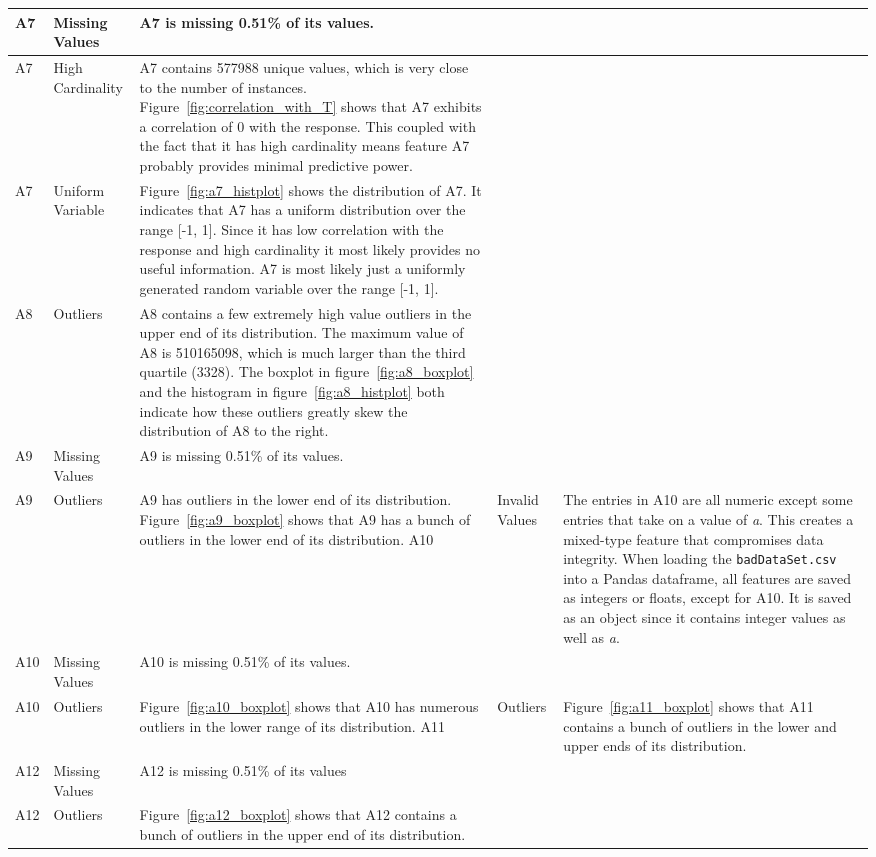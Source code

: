 \documentclass[11pt]{report}
\begin{document}
\begin{longtable}{lp{5cm}p{8cm}}
\midrule
A7 & Missing Values & A7 is missing 0.51\% of its values. \\
\midrule
A7 & High Cardinality & A7 contains 577988 unique values, which is very close to the number of instances. Figure~\ref{fig:correlation_with_T} shows that A7 exhibits a correlation of 0 with the response. This coupled with the fact that it has high cardinality means feature A7 probably provides minimal predictive power. \\
\midrule
A7 & Uniform Variable & Figure~\ref{fig:a7_histplot} shows the distribution of A7. It indicates that A7 has a uniform distribution over the range [-1, 1]. Since it has low correlation with the response and high cardinality it most likely provides no useful information. A7 is most likely just a uniformly generated random variable over the range [-1, 1]. \\
\midrule
A8 & Outliers & A8 contains a few extremely high value outliers in the upper end of its distribution. The maximum value of A8 is 510165098, which is much larger than the third quartile (3328). The boxplot in figure~\ref{fig:a8_boxplot} and the histogram in figure~\ref{fig:a8_histplot} both indicate how these outliers greatly skew the distribution of A8 to the right. \\
\midrule
A9 & Missing Values & A9 is missing 0.51\% of its values. \\
\midrule
A9 & Outliers & A9 has outliers in the lower end of its distribution. Figure~\ref{fig:a9_boxplot} shows that A9 has a bunch of outliers in the lower end of its distribution.
\midrule
A10 & Invalid Values & The entries in A10 are all numeric except some entries that take on a value of \textit{a}. This creates a mixed-type feature that compromises data integrity. When loading the \texttt{badDataSet.csv} into a Pandas dataframe, all features are saved as integers or floats, except for A10. It is saved as an object since it contains integer values as well as \textit{a}. \\
\midrule
A10 & Missing Values & A10 is missing 0.51\% of its values. \\
\midrule
A10 & Outliers & Figure~\ref{fig:a10_boxplot} shows that A10 has numerous outliers in the lower range of its distribution.
\midrule
A11 & Outliers & Figure~\ref{fig:a11_boxplot} shows that A11 contains a bunch of outliers in the lower and upper ends of its distribution. \\
\midrule
A12 & Missing Values & A12 is missing 0.51\% of its values \\
\midrule
A12 & Outliers & Figure~\ref{fig:a12_boxplot} shows that A12 contains a bunch of outliers in the upper end of its distribution. \\
\end{longtable}
\end{document}
